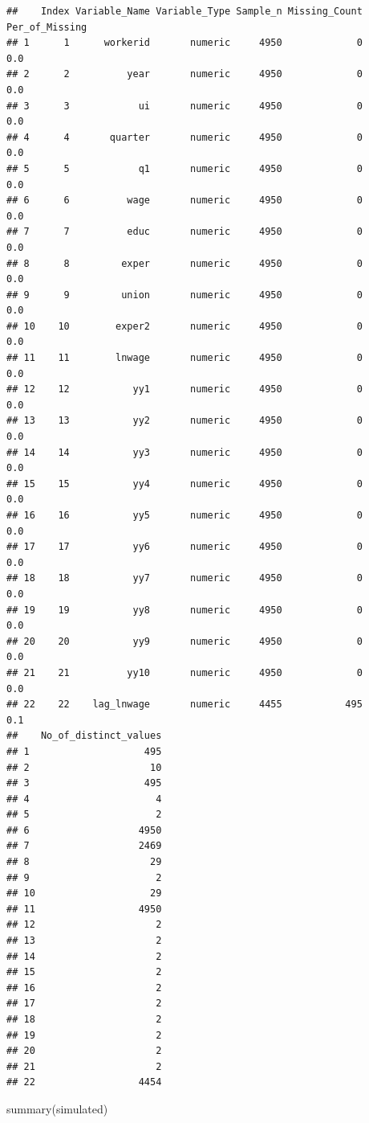 \documentclass[
]{article}
\newenvironment{Shaded}{\begin{snugshade}}{\end{snugshade}}
\newcommand{\FunctionTok}[1]{\textcolor[rgb]{0.00,0.00,0.00}{#1}}
\newcommand{\NormalTok}[1]{#1}
\begin{document}
\begin{verbatim}
##    Index Variable_Name Variable_Type Sample_n Missing_Count Per_of_Missing
## 1      1      workerid       numeric     4950             0            0.0
## 2      2          year       numeric     4950             0            0.0
## 3      3            ui       numeric     4950             0            0.0
## 4      4       quarter       numeric     4950             0            0.0
## 5      5            q1       numeric     4950             0            0.0
## 6      6          wage       numeric     4950             0            0.0
## 7      7          educ       numeric     4950             0            0.0
## 8      8         exper       numeric     4950             0            0.0
## 9      9         union       numeric     4950             0            0.0
## 10    10        exper2       numeric     4950             0            0.0
## 11    11        lnwage       numeric     4950             0            0.0
## 12    12           yy1       numeric     4950             0            0.0
## 13    13           yy2       numeric     4950             0            0.0
## 14    14           yy3       numeric     4950             0            0.0
## 15    15           yy4       numeric     4950             0            0.0
## 16    16           yy5       numeric     4950             0            0.0
## 17    17           yy6       numeric     4950             0            0.0
## 18    18           yy7       numeric     4950             0            0.0
## 19    19           yy8       numeric     4950             0            0.0
## 20    20           yy9       numeric     4950             0            0.0
## 21    21          yy10       numeric     4950             0            0.0
## 22    22    lag_lnwage       numeric     4455           495            0.1
##    No_of_distinct_values
## 1                    495
## 2                     10
## 3                    495
## 4                      4
## 5                      2
## 6                   4950
## 7                   2469
## 8                     29
## 9                      2
## 10                    29
## 11                  4950
## 12                     2
## 13                     2
## 14                     2
## 15                     2
## 16                     2
## 17                     2
## 18                     2
## 19                     2
## 20                     2
## 21                     2
## 22                  4454
\end{verbatim}

\begin{Shaded}
\begin{Highlighting}[]
  \FunctionTok{summary}\NormalTok{(simulated)}
\end{Highlighting}
\end{Shaded}
\end{document}
